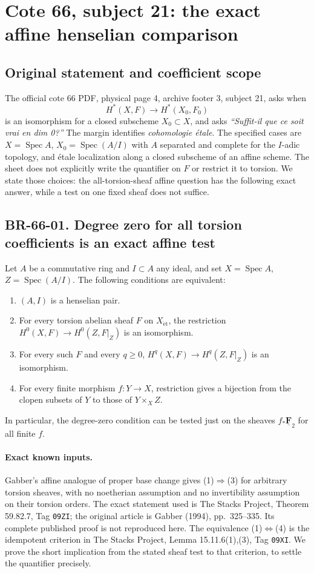 \section{Cote 66, subject 21: the exact affine henselian comparison}

\subsection{Original statement and coefficient scope}
The official cote 66 PDF, physical page 4, archive footer 3, subject 21,
asks when
\[
 H^*(X,F)\longrightarrow H^*(X_0,F_0)
\]
is an isomorphism for a closed subscheme $X_0\subset X$, and asks
\emph{``Suffit-il que ce soit vrai en dim 0?''}
The margin identifies \emph{cohomologie \'etale}. The specified cases
are $X=\operatorname{Spec}A$, $X_0=\operatorname{Spec}(A/I)$ with
$A$ separated and complete for the $I$-adic topology, and \'etale
localization along a closed subscheme of an affine scheme.
The sheet does not explicitly write the quantifier on $F$ or restrict
it to torsion. We state those choices: the all-torsion-sheaf affine
question has the following exact answer, while a test on one fixed
sheaf does not suffice.

\subsection{BR-66-01. Degree zero for all torsion coefficients is an exact affine test}
Let $A$ be a commutative ring and $I\subset A$ any ideal, and set
$X=\operatorname{Spec}A$, $Z=\operatorname{Spec}(A/I)$. The following
conditions are equivalent:
\begin{enumerate}
\item $(A,I)$ is a henselian pair.
\item For every torsion abelian sheaf $F$ on $X_{\mathrm{\acute et}}$,
      the restriction $H^0(X,F)\to H^0(Z,F|_Z)$ is an isomorphism.
\item For every such $F$ and every $q\geq0$,
      $H^q(X,F)\to H^q(Z,F|_Z)$ is an isomorphism.
\item For every finite morphism $f:Y\to X$, restriction gives a
      bijection from the clopen subsets of $Y$ to those of
      $Y\times_X Z$.
\end{enumerate}
In particular, the degree-zero condition can be tested just on the
sheaves $f_*\underline{\mathbf F}_2$ for all finite $f$.

\paragraph{Exact known inputs.}
Gabber's affine analogue of proper base change gives (1)$\Rightarrow$(3)
for arbitrary torsion sheaves, with no noetherian assumption and no
invertibility assumption on their torsion orders. The exact statement
used is The Stacks Project, Theorem 59.82.7, Tag \texttt{09ZI}; the
original article is Gabber (1994), pp.~325--335. Its complete published
proof is not reproduced here. The equivalence (1)$\Leftrightarrow$(4)
is the idempotent criterion in The Stacks Project, Lemma 15.11.6(1),(3),
Tag \texttt{09XI}. We prove the short implication from the stated
sheaf test to that criterion, to settle the quantifier precisely.

